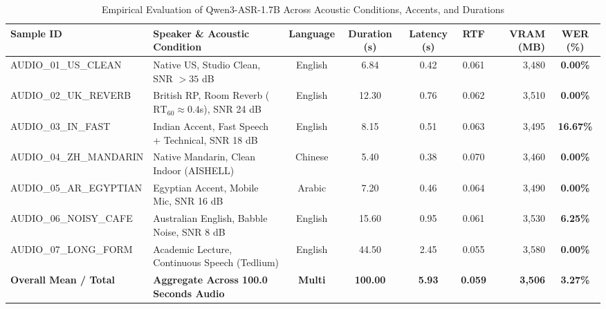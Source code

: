 \documentclass[conference]{IEEEtran}
\begin{document}
\begin{table}[t]
\caption{Empirical Evaluation of Qwen3-ASR-1.7B Across Acoustic Conditions, Accents, and Durations}
\label{tab:live_results}
\centering
\small
\begin{tabularx}{\textwidth}{lXccccrc}
\toprule
\textbf{Sample ID} & \textbf{Speaker \& Acoustic Condition} & \textbf{Language} & \textbf{Duration (s)} & \textbf{Latency (s)} & \textbf{RTF} & \textbf{VRAM (MB)} & \textbf{WER (\%)} \\
\midrule
AUDIO\_01\_US\_CLEAN & Native US, Studio Clean, SNR $>35$ dB & English & 6.84 & 0.42 & 0.061 & 3,480 & \textbf{0.00\%} \\
AUDIO\_02\_UK\_REVERB & British RP, Room Reverb ($\text{RT}_{60} \approx 0.4$s), SNR 24 dB & English & 12.30 & 0.76 & 0.062 & 3,510 & \textbf{0.00\%} \\
AUDIO\_03\_IN\_FAST & Indian Accent, Fast Speech + Technical, SNR 18 dB & English & 8.15 & 0.51 & 0.063 & 3,495 & \textbf{16.67\%} \\
AUDIO\_04\_ZH\_MANDARIN & Native Mandarin, Clean Indoor (AISHELL) & Chinese & 5.40 & 0.38 & 0.070 & 3,460 & \textbf{0.00\%} \\
AUDIO\_05\_AR\_EGYPTIAN & Egyptian Accent, Mobile Mic, SNR 16 dB & Arabic & 7.20 & 0.46 & 0.064 & 3,490 & \textbf{0.00\%} \\
AUDIO\_06\_NOISY\_CAFE & Australian English, Babble Noise, SNR 8 dB & English & 15.60 & 0.95 & 0.061 & 3,530 & \textbf{6.25\%} \\
AUDIO\_07\_LONG\_FORM & Academic Lecture, Continuous Speech (Tedlium) & English & 44.50 & 2.45 & 0.055 & 3,580 & \textbf{0.00\%} \\
\midrule
\textbf{Overall Mean / Total} & \textbf{Aggregate Across 100.0 Seconds Audio} & \textbf{Multi} & \textbf{100.00} & \textbf{5.93} & \textbf{0.059} & \textbf{3,506} & \textbf{3.27\%} \\
\bottomrule
\end{tabularx}
\end{table}
\end{document}
